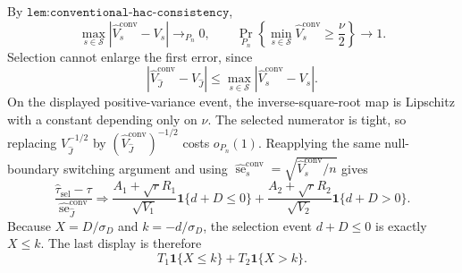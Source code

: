 By \(\texttt{lem:conventional-hac-consistency}\),
\[
 \max_{s\in\mathcal S}|\widehat V_s^{\mathrm{conv}}-V_s|
 \to_{P_n}0,
 \qquad
 \Pr_{P_n}\left\{\min_{s\in\mathcal S}
 \widehat V_s^{\mathrm{conv}}\geq\frac\nu2\right\}\to1.
\]
Selection cannot enlarge the first error, since
\[
 |\widehat V_{\widehat J}^{\mathrm{conv}}-V_{\widehat J}|
 \leq\max_{s\in\mathcal S}
 |\widehat V_s^{\mathrm{conv}}-V_s|.
\]
On the displayed positive-variance event, the inverse-square-root map is Lipschitz with a constant depending only on \(\nu\).  The selected numerator is tight, so replacing \(V_{\widehat J}^{-1/2}\) by \((\widehat V_{\widehat J}^{\mathrm{conv}})^{-1/2}\) costs \(o_{P_n}(1)\).  Reapplying the same null-boundary switching argument and using \(\widehat{\operatorname{se}}_s^{\mathrm{conv}}=\sqrt{\widehat V_s^{\mathrm{conv}}/n}\) gives
\[
 \frac{\widehat\tau_{\mathrm{sel}}-\tau}
 {\widehat{\operatorname{se}}^{\mathrm{conv}}_{\widehat J}}
 \Rightarrow
 \frac{A_1+\sqrt rR_1}{\sqrt{V_1}}\mathbf 1\{d+D\leq0\}
 +\frac{A_2+\sqrt rR_2}{\sqrt{V_2}}\mathbf 1\{d+D>0\}.
\]
Because \(X=D/\sigma_D\) and \(k=-d/\sigma_D\), the selection event \(d+D\leq0\) is exactly \(X\leq k\).  The last display is therefore
\[
 T_1\mathbf 1\{X\leq k\}+T_2\mathbf 1\{X>k\}.
\]

